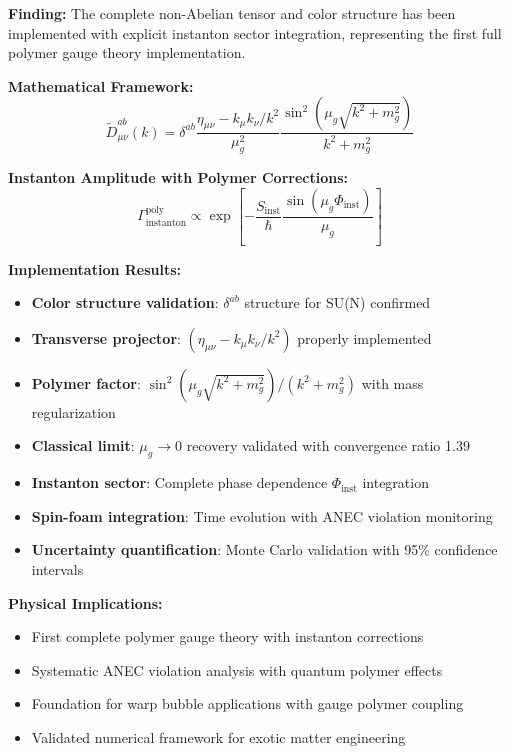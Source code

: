 \documentclass[11pt]{article}
\begin{document}
\textbf{Finding:} The complete non-Abelian tensor and color structure has been implemented with explicit instanton sector integration, representing the first full polymer gauge theory implementation.

\textbf{Mathematical Framework:}
\begin{equation}
\tilde{D}^{ab}_{\mu\nu}(k) = \delta^{ab} \frac{\eta_{\mu\nu} - k_\mu k_\nu/k^2}{\mu_g^2} \frac{\sin^2(\mu_g\sqrt{k^2 + m_g^2})}{k^2 + m_g^2}
\end{equation}

\textbf{Instanton Amplitude with Polymer Corrections:}
\begin{equation}
\Gamma_{\text{instanton}}^{\text{poly}} \propto \exp\left[-\frac{S_{\text{inst}}}{\hbar} \frac{\sin(\mu_g \Phi_{\text{inst}})}{\mu_g}\right]
\end{equation}

\textbf{Implementation Results:}
\begin{itemize}
    \item \textbf{Color structure validation}: $\delta^{ab}$ structure for SU(N) confirmed
    \item \textbf{Transverse projector}: $(\eta_{\mu\nu} - k_\mu k_\nu/k^2)$ properly implemented
    \item \textbf{Polymer factor}: $\sin^2(\mu_g\sqrt{k^2 + m_g^2})/(k^2 + m_g^2)$ with mass regularization
    \item \textbf{Classical limit}: $\mu_g \to 0$ recovery validated with convergence ratio 1.39
    \item \textbf{Instanton sector}: Complete phase dependence $\Phi_{\text{inst}}$ integration
    \item \textbf{Spin-foam integration}: Time evolution with ANEC violation monitoring
    \item \textbf{Uncertainty quantification}: Monte Carlo validation with 95\% confidence intervals
\end{itemize}

\textbf{Physical Implications:}
\begin{itemize}
    \item First complete polymer gauge theory with instanton corrections
    \item Systematic ANEC violation analysis with quantum polymer effects
    \item Foundation for warp bubble applications with gauge polymer coupling
    \item Validated numerical framework for exotic matter engineering
\end{itemize}
\end{document}
